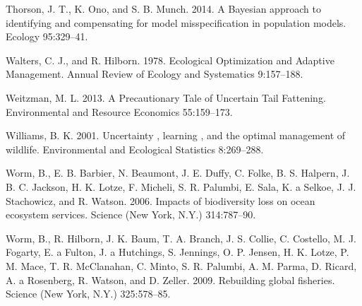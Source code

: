 \documentclass[author-year, 12pt,review]{components/elsarticle} %
\begin{document}
Thorson, J. T., K. Ono, and S. B. Munch. 2014. A Bayesian approach to
identifying and compensating for model misspecification in population
models. Ecology 95:329--41.

Walters, C. J., and R. Hilborn. 1978. Ecological Optimization and
Adaptive Management. Annual Review of Ecology and Systematics
9:157--188.

Weitzman, M. L. 2013. A Precautionary Tale of Uncertain Tail Fattening.
Environmental and Resource Economics 55:159--173.

Williams, B. K. 2001. Uncertainty , learning , and the optimal
management of wildlife. Environmental and Ecological Statistics
8:269--288.

Worm, B., E. B. Barbier, N. Beaumont, J. E. Duffy, C. Folke, B. S.
Halpern, J. B. C. Jackson, H. K. Lotze, F. Micheli, S. R. Palumbi, E.
Sala, K. a Selkoe, J. J. Stachowicz, and R. Watson. 2006. Impacts of
biodiversity loss on ocean ecosystem services. Science (New York, N.Y.)
314:787--90.

Worm, B., R. Hilborn, J. K. Baum, T. A. Branch, J. S. Collie, C.
Costello, M. J. Fogarty, E. a Fulton, J. a Hutchings, S. Jennings, O. P.
Jensen, H. K. Lotze, P. M. Mace, T. R. McClanahan, C. Minto, S. R.
Palumbi, A. M. Parma, D. Ricard, A. a Rosenberg, R. Watson, and D.
Zeller. 2009. Rebuilding global fisheries. Science (New York, N.Y.)
325:578--85.
\end{document}
